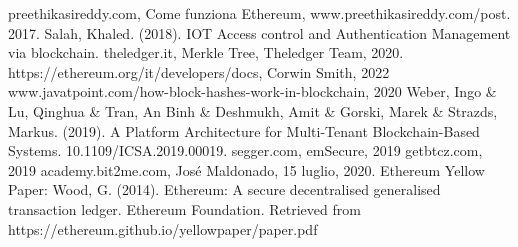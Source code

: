 \documentclass[a4paper,11pt]{report}
\begin{document}
\begin{thebibliography}{100}
 preethikasireddy.com, Come funziona Ethereum, www.preethikasireddy.com/post. 2017.
 Salah, Khaled. (2018). IOT Access control and Authentication Management via blockchain. 
 theledger.it, Merkle Tree, Theledger Team, 2020.
 https://ethereum.org/it/developers/docs, Corwin Smith, 2022
 www.javatpoint.com/how-block-hashes-work-in-blockchain, 2020
 Weber, Ingo \& Lu, Qinghua \& Tran, An Binh \& Deshmukh, Amit \& Gorski, Marek \& Strazds, Markus. (2019). A Platform Architecture for Multi-Tenant Blockchain-Based Systems. 10.1109/ICSA.2019.00019. 
 segger.com, emSecure, 2019
 getbtcz.com, 2019
 academy.bit2me.com, José Maldonado, 15 luglio, 2020.
 Ethereum Yellow Paper: Wood, G. (2014). Ethereum: A secure decentralised generalised transaction ledger. Ethereum Foundation. Retrieved from https://ethereum.github.io/yellowpaper/paper.pdf
\end{thebibliography}
\end{document}
